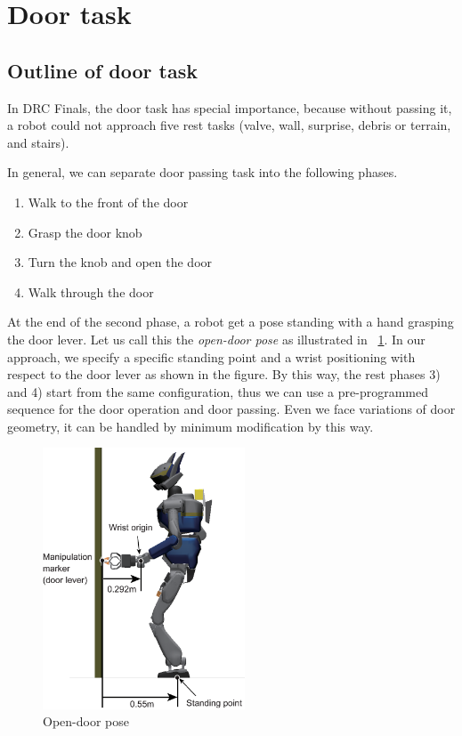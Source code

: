 \section{Door task}
	\label{sub:door}

\subsection{Outline of door task}
%
In DRC Finals, the door task has special importance, because without passing it, a robot could not approach five rest tasks (valve, wall, surprise, debris or terrain, and stairs).
   
In general, we can separate door passing task into the following phases.
%
\begin{enumerate}
\item Walk to the front of the door 
\item Grasp the door knob
\item Turn the knob and open the door
\item Walk through the door
\end{enumerate}
%

%

At the end of the second phase, a robot get a pose standing with a hand grasping 
the door lever. Let us call this the {\it open-door pose} as illustrated in \figurename~\ref{fig:door_approaching_config}.
In our approach, we specify a specific standing point and a wrist positioning with respect to 
the door lever as shown in the figure.
By this way, the rest phases 3) and 4) start from the same configuration, thus we can 
use a pre-programmed sequence for the door operation and door passing.
Even we face variations of door geometry, it can be handled by minimum modification by this way.

\begin{figure}[t]
  \centering
  \includegraphics[width = 6cm]{img/door_approaching_config.eps}
  \caption{Open-door pose}
  \label{fig:door_approaching_config}
\end{figure}

